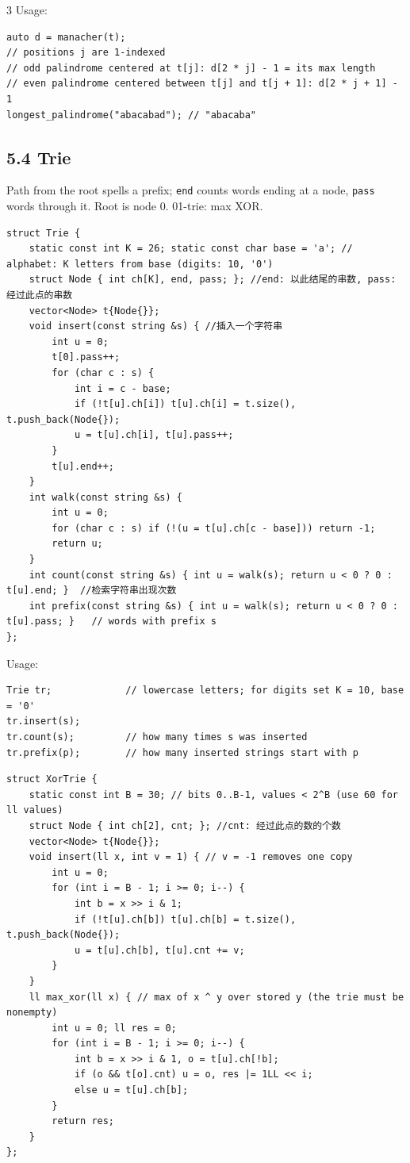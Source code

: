 \documentclass[8pt]{extarticle}
\begin{document}
\begin{multicols*}{3}
Usage:

\begin{lstlisting}
auto d = manacher(t);
// positions j are 1-indexed
// odd palindrome centered at t[j]: d[2 * j] - 1 = its max length
// even palindrome centered between t[j] and t[j + 1]: d[2 * j + 1] - 1
longest_palindrome("abacabad"); // "abacaba"
\end{lstlisting}

\subsection*{5.4 Trie}

Path from the root spells a prefix; \texttt{end} counts words ending at a node, \texttt{pass} words through it. Root is node 0. 01-trie: max XOR.

\begin{lstlisting}
struct Trie {
    static const int K = 26; static const char base = 'a'; // alphabet: K letters from base (digits: 10, '0')
    struct Node { int ch[K], end, pass; }; //end: 以此结尾的串数, pass: 经过此点的串数
    vector<Node> t{Node{}};
    void insert(const string &s) { //插入一个字符串
        int u = 0;
        t[0].pass++;
        for (char c : s) {
            int i = c - base;
            if (!t[u].ch[i]) t[u].ch[i] = t.size(), t.push_back(Node{});
            u = t[u].ch[i], t[u].pass++;
        }
        t[u].end++;
    }
    int walk(const string &s) {
        int u = 0;
        for (char c : s) if (!(u = t[u].ch[c - base])) return -1;
        return u;
    }
    int count(const string &s) { int u = walk(s); return u < 0 ? 0 : t[u].end; }  //检索字符串出现次数
    int prefix(const string &s) { int u = walk(s); return u < 0 ? 0 : t[u].pass; }   // words with prefix s
};
\end{lstlisting}

Usage:

\begin{lstlisting}
Trie tr;             // lowercase letters; for digits set K = 10, base = '0'
tr.insert(s);
tr.count(s);         // how many times s was inserted
tr.prefix(p);        // how many inserted strings start with p
\end{lstlisting}

\begin{lstlisting}
struct XorTrie {
    static const int B = 30; // bits 0..B-1, values < 2^B (use 60 for ll values)
    struct Node { int ch[2], cnt; }; //cnt: 经过此点的数的个数
    vector<Node> t{Node{}};
    void insert(ll x, int v = 1) { // v = -1 removes one copy
        int u = 0;
        for (int i = B - 1; i >= 0; i--) {
            int b = x >> i & 1;
            if (!t[u].ch[b]) t[u].ch[b] = t.size(), t.push_back(Node{});
            u = t[u].ch[b], t[u].cnt += v;
        }
    }
    ll max_xor(ll x) { // max of x ^ y over stored y (the trie must be nonempty)
        int u = 0; ll res = 0;
        for (int i = B - 1; i >= 0; i--) {
            int b = x >> i & 1, o = t[u].ch[!b];
            if (o && t[o].cnt) u = o, res |= 1LL << i;
            else u = t[u].ch[b];
        }
        return res;
    }
};
\end{lstlisting}


\end{multicols*}
\end{document}
